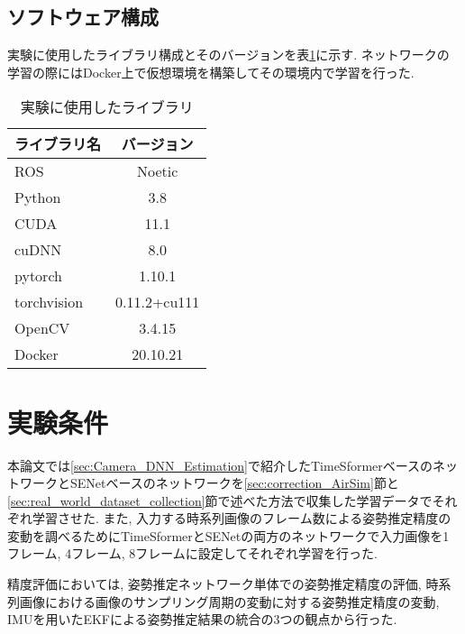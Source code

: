 \subsection{ソフトウェア構成}
実験に使用したライブラリ構成とそのバージョンを表\ref{tab:software}に示す. ネットワークの学習の際にはDocker上で仮想環境を構築してその環境内で学習を行った.

\begin{table}[htbp]
\begin{center}
\caption{実験に使用したライブラリ}
  \begin{tabular}{l|c} \hline
    ライブラリ名 & バージョン \\ \hline
    ROS & Noetic\\
    Python & 3.8\\
    CUDA & 11.1 \\
    cuDNN & 8.0\\
    pytorch & 1.10.1 \\
    torchvision & 0.11.2+cu111 \\
    OpenCV & 3.4.15 \\
    Docker & 20.10.21 \\ \hline
  \end{tabular}
  \label{tab:software}
\end{center}
\end{table}

\section{実験条件}
本論文では\ref{sec:Camera_DNN_Estimation}で紹介したTimeSformerベースのネットワークとSENetベースのネットワークを\ref{sec:correction_AirSim}節と\ref{sec:real_world_dataset_collection}節で述べた方法で収集した学習データでそれぞれ学習させた. また, 入力する時系列画像のフレーム数による姿勢推定精度の変動を調べるためにTimeSformerとSENetの両方のネットワークで入力画像を1フレーム, 4フレーム, 8フレームに設定してそれぞれ学習を行った.\par
精度評価においては, 姿勢推定ネットワーク単体での姿勢推定精度の評価, 時系列画像における画像のサンプリング周期の変動に対する姿勢推定精度の変動, IMUを用いたEKFによる姿勢推定結果の統合の3つの観点から行った.
